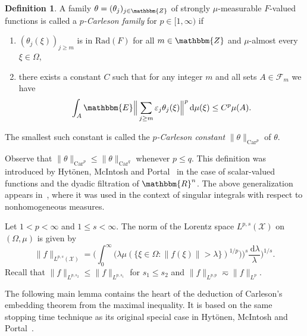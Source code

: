 \documentclass[a4paper,10pt]{amsart}
\theoremstyle{plain}
\theoremstyle{definition}
\newtheorem*{definition*}{Definition}
\theoremstyle{remark}
\begin{document}
\begin{definition*}
A family $\theta = (\theta_j )_{j\in{\mathbbm{Z}}}$ of strongly $\mu$-measurable 
$F$-valued functions is called a \emph{$p$-Carleson family} for $p\in [1,\infty )$ if 
\begin{enumerate}
\item $(\theta_j(\xi))_{j\geq m}$ is in $\text{Rad}(F)$ for all $m\in{\mathbbm{Z}}$ and $\mu$-almost every $\xi\in\Omega$,
\item there exists a constant $C$ such that for any integer $m$ and all sets $A\in\mathcal{F}_m$ we have
\begin{equation*}
  \int_A {\mathbbm{E}} \Big\| \sum_{j\geq m} \varepsilon_j \theta_j (\xi ) \Big\|^p {\,\text{d}}\mu (\xi ) \leq C^p \mu (A) .
\end{equation*}
\end{enumerate}
The smallest such constant is called the \emph{$p$-Carleson constant} $\| \theta \|_{\text{Car}^p}$ of $\theta$.
\end{definition*}

Observe that $\| \theta \|_{\text{Car}^p} \leq \| \theta \|_{\text{Car}^q}$ whenever $p\leq q$. This definition was introduced by Hyt\"onen, McIntosh and Portal~\cite{HMP} in the case of scalar-valued functions and the dyadic filtration of ${\mathbbm{R}}^n$. The above generalization appears in~\cite{HYTONENNONHOMTB}, where it was used in the context of singular integrals with respect to nonhomogeneous measures.

Let $1 < p < \infty$ and $1 \leq s < \infty$.
The norm of the Lorentz space $L^{p,s}(\mathcal{X})$ on $(\Omega , \mu )$ is given by
\begin{equation*}
  \| f \|_{L^{p,s}(\mathcal{X})} = 
  \Big( \int_0^{\infty} \Big( \lambda 
  \mu ( \{ \xi\in\Omega : \| f(\xi ) \| > \lambda \} )^{1/p} ) \Big)^s \frac{{\,\text{d}}\lambda}{\lambda} \Big)^{1/s} .
\end{equation*}
Recall that $\| f \|_{L^{p,s_2}} \leq \| f \|_{L^{p,s_1}}$ for $s_1\leq s_2$ and
$\| f \|_{L^{p,p}} \eqsim \| f \|_{L^p}$.

The following main lemma contains the heart of the deduction of Carleson's embedding theorem from the maximal inequality. It is based on the same stopping time technique as its original special case in Hyt\"onen, McIntosh and Portal~\cite{HMP}.
\end{document}
